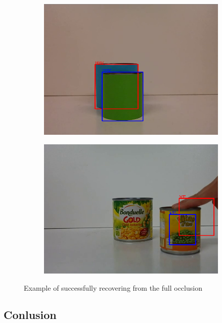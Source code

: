 \begin{figure}
\centering
\begin{subfigure}{0.48\linewidth}
\includegraphics[width=\linewidth]{img/experiments/color-occlusion.png}
\caption{}
\end{subfigure}
\begin{subfigure}{0.48\linewidth}
\includegraphics[width=\linewidth]{img/experiments/occlusion.png}
\caption{}
\end{subfigure}
\label{fig:occlusion}
\caption{Example of successfully recovering from the full occlusion}
\end{figure}

\subsection{Conlusion}

